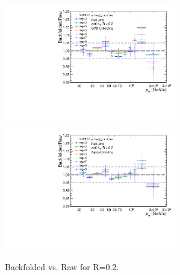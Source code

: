 \documentclass[ALICE]{ALICE_analysis_notes}
\begin{document}
\begin{figure}
    \centering
    \begin{multicols}{2}
        \includegraphics[width=7.5cm]{figures/pPbFigures/UnfoldingComparisons/BackfoldedVsRaw/RatioFoldRawSvd_R02.pdf}
    \vfill\null
    \columnbreak
        \includegraphics[width=7.5cm]{figures/pPbFigures/UnfoldingComparisons/BackfoldedVsRaw/RatioFoldRawBayes_R02.pdf}
        \vfill\null
    \end{multicols}
    \caption{Backfolded vs. Raw for R=0.2.}
    \label{fig:BackfoldedRawpPb}
\end{figure}
\end{document}
